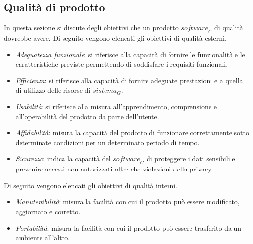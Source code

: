 \subsection{Qualità di prodotto}
In questa sezione si discute degli obiettivi che un prodotto $\textit{software}_G$ di qualità dovrebbe avere.
Di seguito vengono elencati gli obiettivi di qualità esterni.
\begin{itemize}
    \item \emph{Adeguatezza funzionale}:
    si riferisce alla capacità di fornire le funzionalità e le caratteristiche previste permettendo di soddisfare i requisiti funzionali.
    \item \emph{Efficienza}:
    si riferisce alla capacità di fornire adeguate prestazioni e a quella di utilizzo delle risorse di $\textit{sistema}_G$.
    \item \emph{Usabilità}:
    si riferisce alla misura all'apprendimento, comprensione e all'operabilità del prodotto da parte dell'utente.
    \item \emph{Affidabilità}:
    misura la capacità del prodotto di funzionare correttamente sotto determinate condizioni per un determinato periodo di tempo.
    \item \emph{Sicurezza}:
    indica la capacità del $\textit{software}_G$ di proteggere i dati sensibili e prevenire accessi non autorizzati oltre che violazioni della privacy.
\end{itemize}
Di seguito vengono elencati gli obiettivi di qualità interni.
\begin{itemize}
    \item \emph{Manutenibilità}:
    misura la facilità con cui il prodotto può essere modificato, aggiornato e corretto.
    \item \emph{Portabilità}:
    misura la facilità con cui il prodotto può essere trasferito da un ambiente all'altro.
\end{itemize}

